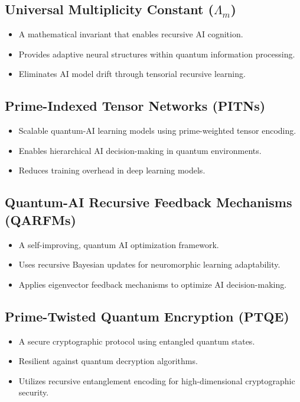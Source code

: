 \documentclass{article}
\theoremstyle{plain}
\begin{document}
\begin{itemize}
\subsection{Universal Multiplicity Constant ($\Lambda_m$)}
\begin{itemize}
    \item A mathematical invariant that enables recursive AI cognition.
    \item Provides adaptive neural structures within quantum information processing.
    \item Eliminates AI model drift through tensorial recursive learning.
\end{itemize}

\subsection{Prime-Indexed Tensor Networks (PITNs)}
\begin{itemize}
    \item Scalable quantum-AI learning models using prime-weighted tensor encoding.
    \item Enables hierarchical AI decision-making in quantum environments.
    \item Reduces training overhead in deep learning models.
\end{itemize}

\subsection{Quantum-AI Recursive Feedback Mechanisms (QARFMs)}
\begin{itemize}
    \item A self-improving, quantum AI optimization framework.
    \item Uses recursive Bayesian updates for neuromorphic learning adaptability.
    \item Applies eigenvector feedback mechanisms to optimize AI decision-making.
\end{itemize}

\subsection{Prime-Twisted Quantum Encryption (PTQE)}
\begin{itemize}
    \item A secure cryptographic protocol using entangled quantum states.
    \item Resilient against quantum decryption algorithms.
    \item Utilizes recursive entanglement encoding for high-dimensional cryptographic security.
\end{itemize}


\end{itemize}
\end{document}
